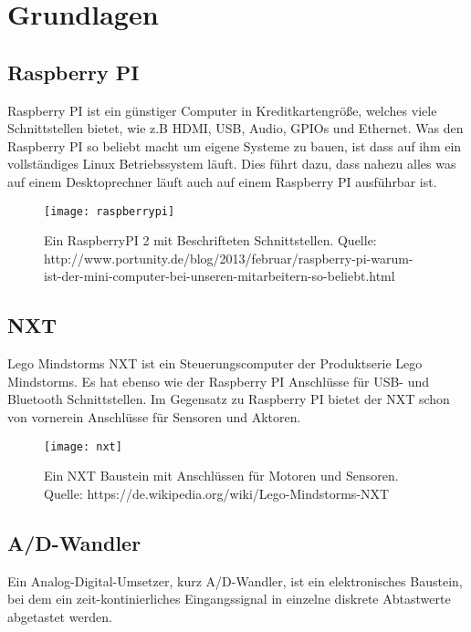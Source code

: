 \chapter{Grundlagen}
\section{Raspberry PI}
\label{Grundlagen:RaspberryPI}

Raspberry PI ist ein günstiger Computer in Kreditkartengröße, welches viele Schnittstellen bietet, wie z.B HDMI, USB, Audio, GPIOs und Ethernet.
Was den Raspberry PI so beliebt macht um eigene Systeme zu bauen, ist dass auf ihm ein vollständiges Linux Betriebssystem läuft. Dies führt dazu, dass nahezu alles was auf einem Desktoprechner läuft auch auf einem Raspberry PI ausführbar ist.

\begin{figure}[h]
  \centering
  \texttt{[image: raspberrypi]}
  \caption{Ein RaspberryPI 2 mit Beschrifteten Schnittstellen. Quelle: http://www.portunity.de/blog/2013/februar/raspberry-pi-warum-ist-der-mini-computer-bei-unseren-mitarbeitern-so-beliebt.html}
  \label{Kap1:RaspberryPI}
\end{figure}

\section{NXT}
\label{Grundlagen:NXT}

Lego Mindstorms NXT ist ein Steuerungscomputer der Produktserie Lego Mindstorms. Es hat ebenso wie der Raspberry PI Anschlüsse für USB- und Bluetooth Schnittstellen. Im Gegensatz zu Raspberry PI bietet der NXT schon von vornerein Anschlüsse für Sensoren und Aktoren. 

\begin{figure}[h]
  \centering
  \texttt{[image: nxt]}
  \caption{Ein NXT Baustein mit Anschlüssen für Motoren und Sensoren. Quelle: https://de.wikipedia.org/wiki/Lego-Mindstorms-NXT}
  \label{Kap1:NXT}
\end{figure}



\section{A/D-Wandler}

Ein Analog-Digital-Umsetzer, kurz A/D-Wandler, ist ein elektronisches Baustein, bei dem ein zeit-kontinierliches Eingangssignal in einzelne diskrete Abtastwerte abgetastet werden.

